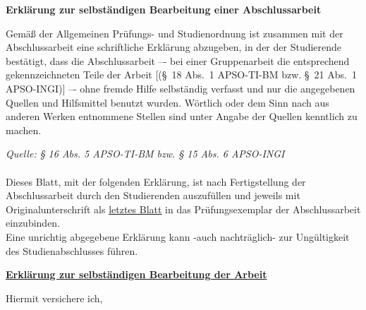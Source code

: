 \fancyhead{}
\fancyhf{}
\selectfont \fontsize{12}{15}\selectfont
{}
\fancyhead[RO,LE]{\changefontbig\thepage}
\setlength{\parskip}{0pt}
\begin{center}
\textbf{\sffamily\large Erklärung zur selbständigen Bearbeitung einer Abschlussarbeit}
\\\end{center}
{\footnotesize
Gemäß der Allgemeinen Prüfungs- und Studienordnung ist zusammen mit der Abschlussarbeit eine schriftliche Erklärung abzugeben, in der der Studierende bestätigt, dass die Abschlussarbeit \glqq–- bei einer Gruppenarbeit die entsprechend gekennzeichneten Teile der Arbeit [(§~18 Abs.~1 APSO-TI-BM bzw. §~21 Abs.~1 APSO-INGI)] –- ohne fremde Hilfe selbständig verfasst und nur die angegebenen Quellen und Hilfsmittel benutzt wurden. Wörtlich oder dem Sinn nach aus anderen Werken entnommene Stellen sind unter Angabe der Quellen kenntlich zu machen.\grqq
}

\hfill {\em\scriptsize Quelle: § 16 Abs. 5 APSO-TI-BM bzw. § 15 Abs. 6 APSO-INGI}
\\ \\
{\footnotesize
Dieses Blatt, mit der folgenden Erklärung, ist nach Fertigstellung der Abschlussarbeit durch den Studierenden auszufüllen und jeweils mit Originalunterschrift als \underline{letztes Blatt} in das Prüfungsexemplar der Abschlussarbeit einzubinden.\\
Eine unrichtig abgegebene Erklärung kann -auch nachträglich- zur Ungültigkeit des Studienabschlusses führen.
}


\vspace{1cm}\begin{center}
    
\textbf{\sffamily \underline{Erklärung zur selbständigen Bearbeitung der Arbeit}}

\end{center}
Hiermit versichere ich,\\
\par\noindent{}    
\\
\par\noindent{} 
\\


